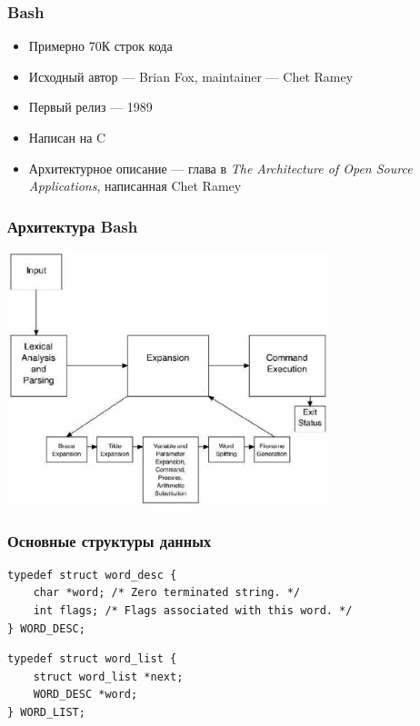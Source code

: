 \documentclass[xetex,mathserif,serif]{beamer}
\begin{document}
    \begin{frame}
        \frametitle{Bash}
        \begin{itemize}
            \item Примерно 70К строк кода
            \item Исходный автор --- Brian Fox, maintainer --- Chet Ramey
            \item Первый релиз --- 1989
            \item Написан на C
            \item Архитектурное описание --- глава в \textit{The Architecture of Open Source Applications}, написанная Chet Ramey
        \end{itemize}
    \end{frame}

    \begin{frame}
        \frametitle{Архитектура Bash}
        \begin{center}
            \includegraphics[width=0.7\textwidth]{bashArchitecture.png}
        \end{center}
    \end{frame}

    \begin{frame}[fragile]
        \frametitle{Основные структуры данных}
        \begin{verbatim}
typedef struct word_desc {
    char *word; /* Zero terminated string. */
    int flags; /* Flags associated with this word. */
} WORD_DESC;
        \end{verbatim}

        \vspace{3mm}

        \begin{verbatim}
typedef struct word_list {
    struct word_list *next;
    WORD_DESC *word;
} WORD_LIST;
        \end{verbatim}
    \end{frame}
\end{document}

